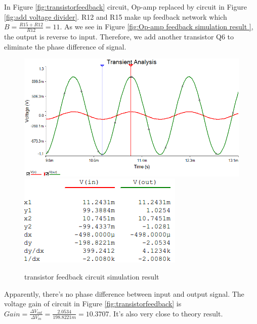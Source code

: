 In Figure \ref{fig:transistorfeedback} circuit, Op-amp replaced by circuit in Figure \ref{fig:add voltage divider}. R12 and R15 make up feedback network which $ B = \frac{R15+R12}{R12} = 11 $. As we see in Figure \ref{fig:Op-amp  feedback simulation result }, the output is reverse to input. Therefore, we add another transistor Q6 to eliminate the phase difference of signal.


\begin{figure}[htbp]
\centering
\includegraphics[scale=0.6]{"../Photo/Chap2/transistor feedback simulation wave"}\\[0.5cm]
\includegraphics[scale=1]{"../Photo/Chap2/transistor feedback simulation cursor data"}
\caption{transistor feedback circuit simulation result}
\label{fig:transistorfeedbacksimulationwave}
\end{figure}

Apparently, there's no phase difference between input and output signal. 
The voltage gain of circuit in Figure \ref{fig:transistorfeedback} is $ Gain = \frac{\Delta V_{out}}{\Delta V_{in}} = \frac{2.0534}{198.8221m} = 10.3707$. It's also very close to theory result.
 
 
